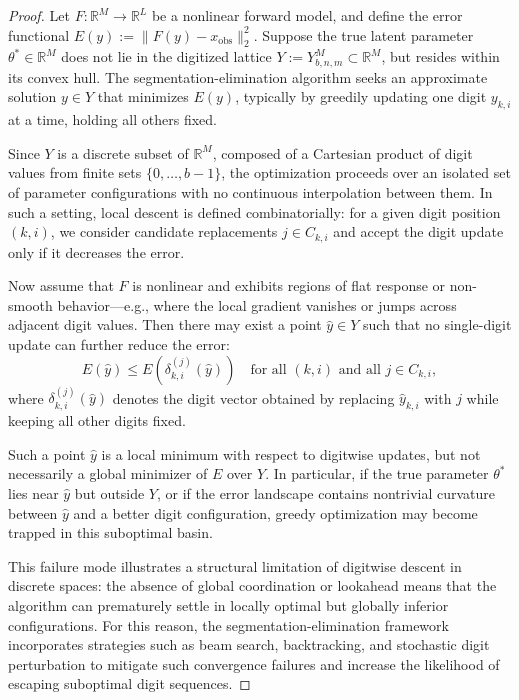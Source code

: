 \documentclass[aps,twocolumn,superscriptaddress,nofootinbib]{revtex4}
\begin{document}
\begin{proof}
Let \( F: \mathbb{R}^M \rightarrow \mathbb{R}^L \) be a nonlinear forward model, and define the error functional \( E(y) := \|F(y) - x_{\text{obs}}\|_2^2 \). Suppose the true latent parameter \( \theta^\ast \in \mathbb{R}^M \) does not lie in the digitized lattice \( Y := Y_{b,n,m}^M \subset \mathbb{R}^M \), but resides within its convex hull. The segmentation-elimination algorithm seeks an approximate solution \( y \in Y \) that minimizes \( E(y) \), typically by greedily updating one digit \( y_{k,i} \) at a time, holding all others fixed.

Since \( Y \) is a discrete subset of \( \mathbb{R}^M \), composed of a Cartesian product of digit values from finite sets \( \{0, \dots, b - 1\} \), the optimization proceeds over an isolated set of parameter configurations with no continuous interpolation between them. In such a setting, local descent is defined combinatorially: for a given digit position \( (k, i) \), we consider candidate replacements \( j \in C_{k,i} \) and accept the digit update only if it decreases the error.

Now assume that \( F \) is nonlinear and exhibits regions of flat response or non-smooth behavior—e.g., where the local gradient vanishes or jumps across adjacent digit values. Then there may exist a point \( \hat{y} \in Y \) such that no single-digit update can further reduce the error:
\begin{equation}
E(\hat{y}) \leq E\left( \delta_{k,i}^{(j)}(\hat{y}) \right) \quad \text{for all } (k,i) \text{ and all } j \in C_{k,i},
\end{equation}
where \( \delta_{k,i}^{(j)}(\hat{y}) \) denotes the digit vector obtained by replacing \( \hat{y}_{k,i} \) with \( j \) while keeping all other digits fixed.

Such a point \( \hat{y} \) is a local minimum with respect to digitwise updates, but not necessarily a global minimizer of \( E \) over \( Y \). In particular, if the true parameter \( \theta^\ast \) lies near \( \hat{y} \) but outside \( Y \), or if the error landscape contains nontrivial curvature between \( \hat{y} \) and a better digit configuration, greedy optimization may become trapped in this suboptimal basin.

This failure mode illustrates a structural limitation of digitwise descent in discrete spaces: the absence of global coordination or lookahead means that the algorithm can prematurely settle in locally optimal but globally inferior configurations. For this reason, the segmentation-elimination framework incorporates strategies such as beam search, backtracking, and stochastic digit perturbation to mitigate such convergence failures and increase the likelihood of escaping suboptimal digit sequences.
\end{proof}
\end{document}
